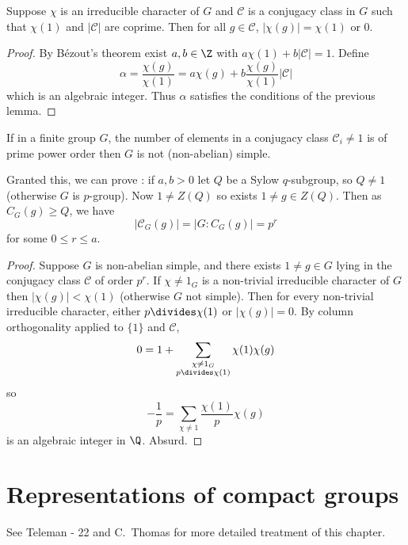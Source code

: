 \documentclass[a4paper]{article}
\newcommand{\ccl}{{\mathcal C}} %
\theoremstyle{definition}
\begin{document}
\begin{lemma}
  Suppose \(\chi\) is an irreducible character of \(G\) and \(\ccl\) is a conjugacy class in \(G\) such that \(\chi(1)\) and \(|\ccl|\) are coprime. Then for all \(g \in \ccl\), \(|\chi(g)| = \chi(1)\) or \(0\).
\end{lemma}

\begin{proof}
  By Bézout's theorem exist \(a, b \in \Z\) with \(a \chi(1) + b |\ccl| = 1\). Define
  \[
    \alpha = \frac{\chi(g)}{\chi(1)} = a \chi(g) + b \frac{\chi(g)}{\chi(1)} |\ccl|
    \]
    which is an algebraic integer. Thus \(\alpha\) satisfies the conditions of the previous lemma.
\end{proof}

\begin{proposition}
  If in a finite group \(G\), the number of elements in a conjugacy class \(\ccl_i \neq 1\) is of prime power order then \(G\) is not (non-abelian) simple.
\end{proposition}

Granted this, we can prove : if \(a, b > 0\) let \(Q\) be a Sylow \(q\)-subgroup, so \(Q \neq 1\) (otherwise \(G\) is \(p\)-group). Now \(1 \neq Z(Q)\) so exists \(1 \neq g \in Z(Q)\). Then as \(C_G(g) \geq Q\), we have
\[
  |\mathcal C_G(g)| = |G: C_G(g)| = p^r
\]
for some \(0 \leq r \leq a\).

\begin{proof}
  Suppose \(G\) is non-abelian simple, and there exists \(1 \neq g \in G\) lying in the conjugacy class \(\ccl\) of order \(p^r\). If \(\chi \neq 1_G\) is a non-trivial irreducible character of \(G\) then \(|\chi(g)| < \chi(1)\) (otherwise \(G\) not simple). Then for every non-trivial irreducible character, either \(p \divides \chi(1)\) or \(|\chi(g)| = 0\). By column orthogonality applied to \(\{1\}\) and \(\ccl\),
  \[
    0 = 1 + \sum_{\substack{\chi \neq 1_G \\ p \divides \chi(1)}} \chi(1) \chi(g)
  \]
  so
  \[
    -\frac{1}{p} = \sum_{\chi \neq 1} \frac{\chi(1)}{p} \chi(g)
  \]
  is an algebraic integer in \(\Q\). Absurd.
\end{proof}

\section{Representations of compact groups}

See Teleman  - 22 and C.\ Thomas  for more detailed treatment of this chapter.
\end{document}
